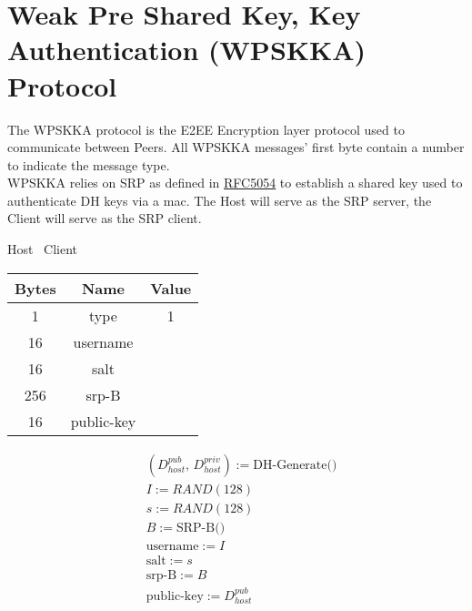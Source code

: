 \section{Weak Pre Shared Key, Key Authentication (WPSKKA) Protocol}

The WPSKKA protocol is the E2EE Encryption layer protocol used to communicate between Peers. All WPSKKA messages'
first byte contain a number to indicate
the message type.\\

WPSKKA relies on SRP as defined in \href{https://datatracker.ietf.org/doc/html/rfc5054}{RFC5054} to establish a
shared key used to authenticate DH keys via a mac. The Host will serve as the SRP server, the Client will serve as the SRP
client.\\

\begin{center}
    Host \textrightarrow\ Client\\
    \begin{tabular}{|c|c|c|}
        \hline
        \textbf{Bytes} & \textbf{Name} & \textbf{Value} \\
        \hline
        1              & type          & 1              \\
        \hline
        16             & username      &                \\
        \hline
        16             & salt          &                \\
        \hline
        256            & srp-B         &                \\
        \hline
        16             & public-key    &                \\
        \hline
    \end{tabular}
\end{center}

\begin{align*}
    & (D_{host}^{pub},\, D_{host}^{priv}) := \text{DH-Generate()}\\
    & I := RAND(128)\\
    & s := RAND(128)\\
    & B := \text{SRP-B()}\\
    & \text{username} := I\\
    & \text{salt} := s\\
    & \text{srp-B} := B\\
    & \text{public-key} := D_{host}^{pub}\\
\end{align*}

